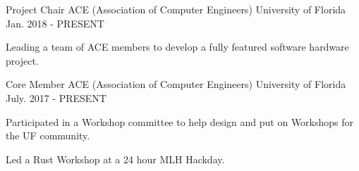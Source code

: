 


\begin{cventries}


\cventry
{Project Chair} %
{ACE (Association of Computer Engineers)} %
{University of Florida} %
{Jan. 2018 - PRESENT} %
{ %
\begin{cvitems}
\item {Leading a team of ACE members to develop a fully featured software hardware project.}
\end{cvitems}
}


\cventry
{Core Member} %
{ACE (Association of Computer Engineers)} %
{University of Florida} %
{July. 2017 - PRESENT} %
{ %
\begin{cvitems}
\item {Participated in a Workshop committee to help design and put on Workshops for the UF community. }
\item {Led a Rust Workshop at a 24 hour MLH Hackday. }
\end{cvitems}
}


\end{cventries}